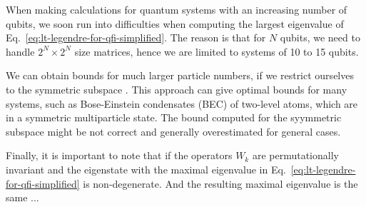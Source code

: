 When making calculations for quantum systems with an increasing number of qubits, we soon run into difficulties when computing the largest eigenvalue of Eq.~\eqref{eq:lt-legendre-for-qfi-simplified}.
The reason is that for $N$ qubits, we need to handle $2^N \times 2^N$ size matrices, hence we are limited to systems of 10 to 15 qubits.

We can obtain bounds for much larger particle numbers, if we restrict ourselves to the symmetric subspace \citep{}.
This approach can give optimal bounds for many systems, such as Bose-Einstein condensates (BEC) of two-level atoms, which are in a symmetric multiparticle state.
The bound computed for the syymmetric subspace might be not correct and generally overestimated for general cases.

Finally, it is important to note that if the operators $W_k$ are permutationally invariant and the eigenstate with the maximal eigenvalue in Eq.~\eqref{eq:lt-legendre-for-qfi-simplified} is non-degenerate.
And the resulting maximal eigenvalue is the same ...

